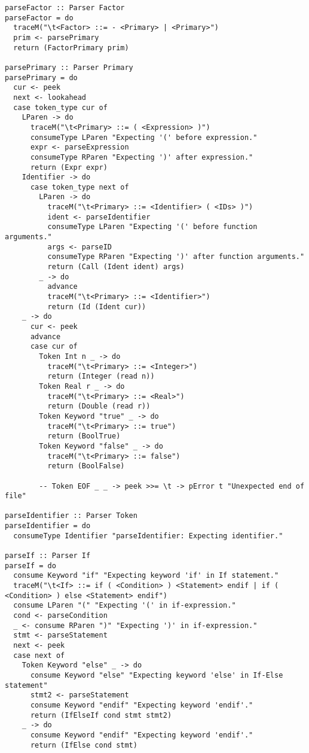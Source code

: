 \documentclass[11pt]{article}
\begin{document}
\begin{verbatim}
parseFactor :: Parser Factor
parseFactor = do
  traceM("\t<Factor> ::= - <Primary> | <Primary>")
  prim <- parsePrimary
  return (FactorPrimary prim)

parsePrimary :: Parser Primary
parsePrimary = do
  cur <- peek
  next <- lookahead
  case token_type cur of
    LParen -> do
      traceM("\t<Primary> ::= ( <Expression> )")
      consumeType LParen "Expecting '(' before expression."
      expr <- parseExpression
      consumeType RParen "Expecting ')' after expression."
      return (Expr expr)
    Identifier -> do
      case token_type next of
        LParen -> do
          traceM("\t<Primary> ::= <Identifier> ( <IDs> )")
          ident <- parseIdentifier
          consumeType LParen "Expecting '(' before function arguments."
          args <- parseID
          consumeType RParen "Expecting ')' after function arguments."
          return (Call (Ident ident) args)
        _ -> do
          advance
          traceM("\t<Primary> ::= <Identifier>")
          return (Id (Ident cur))
    _ -> do
      cur <- peek
      advance
      case cur of
        Token Int n _ -> do
          traceM("\t<Primary> ::= <Integer>")
          return (Integer (read n))
        Token Real r _ -> do
          traceM("\t<Primary> ::= <Real>")
          return (Double (read r))
        Token Keyword "true" _ -> do
          traceM("\t<Primary> ::= true")
          return (BoolTrue)
        Token Keyword "false" _ -> do
          traceM("\t<Primary> ::= false")
          return (BoolFalse)

        -- Token EOF _ _ -> peek >>= \t -> pError t "Unexpected end of file"

parseIdentifier :: Parser Token
parseIdentifier = do
  consumeType Identifier "parseIdentifier: Expecting identifier."

parseIf :: Parser If
parseIf = do
  consume Keyword "if" "Expecting keyword 'if' in If statement."
  traceM("\t<If> ::= if ( <Condition> ) <Statement> endif | if ( <Condition> ) else <Statement> endif")
  consume LParen "(" "Expecting '(' in if-expression."
  cond <- parseCondition
  _ <- consume RParen ")" "Expecting ')' in if-expression."
  stmt <- parseStatement
  next <- peek
  case next of
    Token Keyword "else" _ -> do
      consume Keyword "else" "Expecting keyword 'else' in If-Else statement"
      stmt2 <- parseStatement
      consume Keyword "endif" "Expecting keyword 'endif'."
      return (IfElseIf cond stmt stmt2)
    _ -> do
      consume Keyword "endif" "Expecting keyword 'endif'."
      return (IfElse cond stmt)


\end{verbatim}
\end{document}

